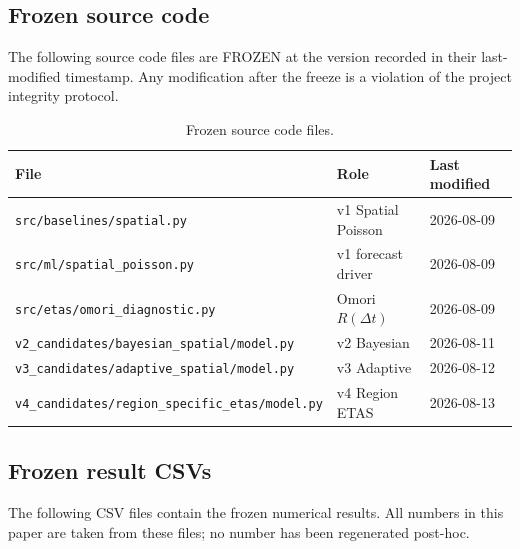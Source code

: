 \documentclass[10pt,a4paper,twocolumn]{article}
\begin{document}
\subsection{Frozen source code}

The following source code files are FROZEN at the version recorded in their last-modified timestamp. Any modification after the freeze is a violation of the project integrity protocol.

\begin{table}[t]
\centering
\caption{Frozen source code files.}\label{tab:frozen-code}
\small
\begin{tabular*}{\columnwidth}{@{\extracolsep{\fill}}lll}
\toprule
File & Role & Last modified \\
\midrule
\texttt{src/baselines/spatial.py} & v1 Spatial Poisson & 2026-08-09 \\
\texttt{src/ml/spatial\_poisson.py} & v1 forecast driver & 2026-08-09 \\
\texttt{src/etas/omori\_diagnostic.py} & Omori $R(\Delta t)$ & 2026-08-09 \\
\texttt{v2\_candidates/bayesian\_spatial/model.py} & v2 Bayesian & 2026-08-11 \\
\texttt{v3\_candidates/adaptive\_spatial/model.py} & v3 Adaptive & 2026-08-12 \\
\texttt{v4\_candidates/region\_specific\_etas/model.py} & v4 Region ETAS & 2026-08-13 \\
\bottomrule
\end{tabular*}
\end{table}

\subsection{Frozen result CSVs}

The following CSV files contain the frozen numerical results. All numbers in this paper are taken from these files; no number has been regenerated post-hoc.
\end{document}
